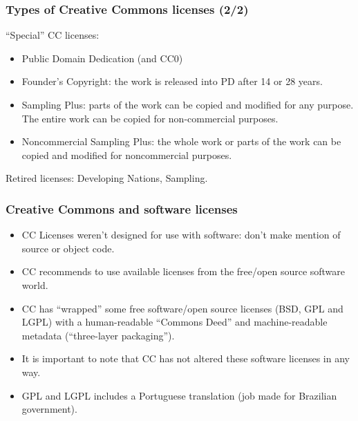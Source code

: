 \begin{frame}
\frametitle{Types of Creative Commons licenses (2/2)}

``Special'' CC licenses:
\begin{itemize}
\item Public Domain Dedication (and CC0)
\item \alert{Founder's Copyright:} the work is released into PD after 14 or 28 years.
\item \alert{Sampling Plus:} parts of the work can be copied and modified for any purpose. The entire work can be copied for non-commercial purposes.
\item \alert{Noncommercial Sampling Plus:} the whole work or parts of the work can be copied and modified for noncommercial purposes. 
\end{itemize}                                                 

Retired licenses: Developing Nations, Sampling.

\end{frame}

\begin{frame}
\frametitle{Creative Commons and software licenses}

\begin{itemize}
\item CC Licenses weren't designed for use with software: don't make mention of source or object code.
\item CC recommends to use available licenses from the free/open source software world.
\item CC has ``wrapped'' some free software/open source licenses (BSD, GPL and LGPL) with a human-readable ``Commons Deed'' and machine-readable metadata (``three-layer packaging'').
\item It is important to note that CC has not altered these software licenses in any way.
\item GPL and LGPL includes a Portuguese translation (job made for Brazilian government).
\end{itemize}                                                 

\end{frame}


